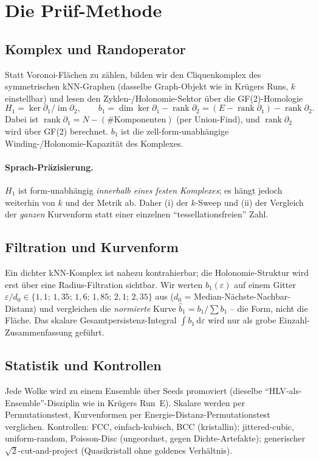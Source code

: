 \section{Die Prüf-Methode}

\subsection{Komplex und Randoperator}
Statt Voronoi-Flächen zu zählen, bilden wir den Cliquenkomplex des
symmetrischen kNN-Graphen (dasselbe Graph-Objekt wie in Krügers Runs, $k$
einstellbar) und lesen den Zyklen-/Holonomie-Sektor über die GF(2)-Homologie
\[
  H_1 = \ker \partial_1 / \operatorname{im} \partial_2,
  \qquad
  b_1 = \dim\ker\partial_1 - \operatorname{rank}\partial_2
      = (E - \operatorname{rank}\partial_1) - \operatorname{rank}\partial_2 .
\]
Dabei ist $\operatorname{rank}\partial_1 = N - (\#\text{Komponenten})$ (per
Union-Find), und $\operatorname{rank}\partial_2$ wird über GF(2) berechnet.
$b_1$ ist die zell-form-unabhängige Winding-/Holonomie-Kapazität des Komplexes.

\paragraph{Sprach-Präzisierung.} $H_1$ ist form-unabhängig \emph{innerhalb
eines festen Komplexes}; es hängt jedoch weiterhin von $k$ und der Metrik ab.
Daher (i) der $k$-Sweep und (ii) der Vergleich der \emph{ganzen} Kurvenform
statt einer einzelnen ``tessellationsfreien'' Zahl.

\subsection{Filtration und Kurvenform}
Ein dichter kNN-Komplex ist nahezu kontrahierbar; die Holonomie-Struktur wird
erst über eine Radius-Filtration sichtbar. Wir werten $b_1(\varepsilon)$ auf
einem Gitter $\varepsilon/d_0 \in \{1{,}1;\,1{,}35;\,1{,}6;\,1{,}85;\,2{,}1;\,
2{,}35\}$ aus ($d_0$ = Median-Nächste-Nachbar-Distanz) und vergleichen die
\emph{normierte} Kurve $\hat b_1 = b_1/\sum b_1$ -- die Form, nicht die Fläche.
Das skalare Gesamtpersistenz-Integral $\int b_1\,\mathrm{d}\varepsilon$ wird nur
als grobe Einzahl-Zusammenfassung geführt.

\subsection{Statistik und Kontrollen}
Jede Wolke wird zu einem Ensemble über Seeds promoviert (dieselbe
``HLV-als-Ensemble''-Disziplin wie in Krügers Run~E). Skalare werden per
Permutationstest, Kurvenformen per Energie-Distanz-Permutationstest
verglichen. Kontrollen: FCC, einfach-kubisch, BCC (kristallin);
jittered-cubic, uniform-random, Poisson-Disc (ungeordnet, gegen
Dichte-Artefakte); generischer $\sqrt{2}$-cut-and-project (Quasikristall ohne
goldenes Verhältnis).

